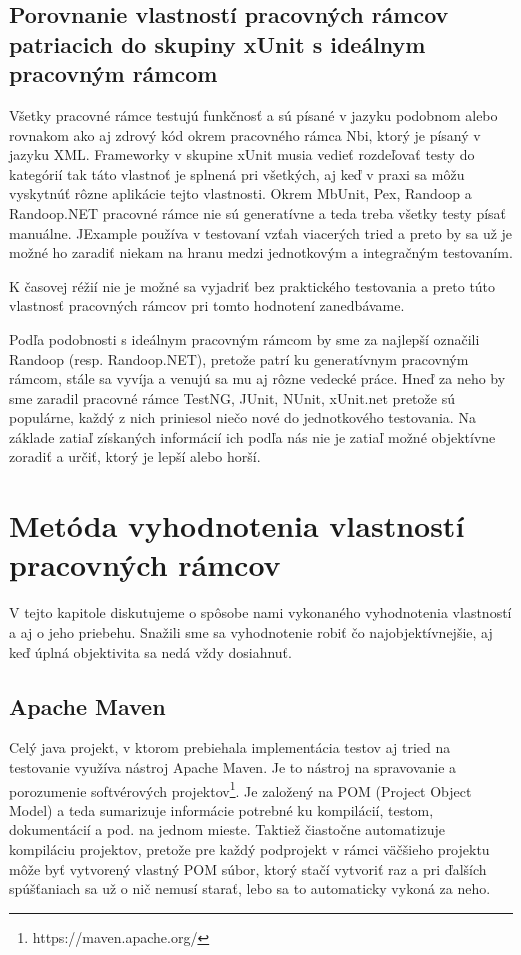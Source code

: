 \documentclass[11pt,twoside,slovak,a4paper]{article}
\begin{document}
	\subsection{Porovnanie vlastností pracovných rámcov patriacich do skupiny xUnit s ideálnym pracovným rámcom}
	
	Všetky pracovné rámce testujú funkčnosť a sú písané v jazyku podobnom alebo rovnakom ako aj zdrový kód okrem pracovného rámca Nbi, ktorý je písaný v jazyku XML. Frameworky v skupine xUnit musia vedieť rozdeľovať testy do kategórií tak táto vlastnoť je splnená pri všetkých, aj keď v praxi sa môžu vyskytnúť rôzne aplikácie tejto vlastnosti.
	Okrem MbUnit, Pex, Randoop a Randoop.NET pracovné rámce nie sú generatívne a teda treba všetky testy písať manuálne.
	JExample používa v testovaní vzťah viacerých tried a preto by sa už je možné ho zaradiť niekam na hranu medzi jednotkovým a integračným testovaním.
	
	K časovej réžií nie je možné sa vyjadriť bez praktického testovania a preto túto vlastnosť pracovných rámcov pri tomto hodnotení zanedbávame.
	
	Podľa podobnosti s ideálnym pracovným rámcom by sme za najlepší označili Randoop (resp. Randoop.NET), pretože patrí ku generatívnym pracovným rámcom, stále sa vyvíja a venujú sa mu aj rôzne vedecké práce. Hneď za neho by sme zaradil pracovné rámce TestNG, JUnit, NUnit, xUnit.net pretože sú populárne, každý z nich priniesol niečo nové do jednotkového testovania. Na základe zatiaľ získaných informácií ich podľa nás nie je zatiaľ možné objektívne zoradiť a určiť, ktorý je lepší alebo horší.
	
	\newpage
	\thispagestyle{plain}
	\section{Metóda vyhodnotenia vlastností pracovných rámcov}
	
	V tejto kapitole diskutujeme o spôsobe nami vykonaného vyhodnotenia vlastností a aj o jeho priebehu. Snažili sme sa vyhodnotenie robiť čo najobjektívnejšie, aj keď úplná objektivita sa nedá vždy dosiahnuť.
	
	\subsection{Apache Maven}
	
	Celý java projekt, v ktorom prebiehala implementácia testov aj tried na testovanie využíva nástroj Apache Maven. Je to nástroj na spravovanie a porozumenie softvérových projektov\footnote{https://maven.apache.org/}. Je založený na POM (Project Object Model) a teda sumarizuje informácie potrebné ku kompilácií, testom, dokumentácií a pod. na jednom mieste. Taktiež čiastočne automatizuje kompiláciu projektov, pretože pre každý podprojekt v rámci väčšieho projektu môže byť vytvorený vlastný POM súbor, ktorý stačí vytvoriť raz a pri ďalších spúšťaniach sa už o nič nemusí starať, lebo sa to automaticky vykoná za neho.
	
\end{document}
